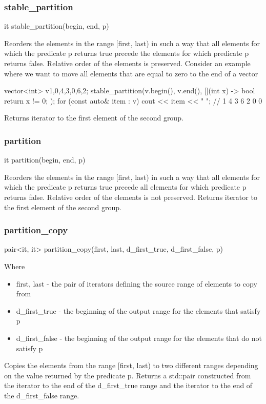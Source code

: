 \documentclass{report}
\begin{document}
\subsubsection{stable\_partition}
\bigbreak \noindent 
\begin{cppcode}
it stable_partition(begin, end, p)
\end{cppcode}
\bigbreak \noindent 
 Reorders the elements in the range [first, last) in such a way that all elements for which the predicate p returns true precede the elements for which predicate p returns false. Relative order of the elements is preserved.
 \bigbreak \noindent 
 Consider an example where we want to move all elements that are equal to zero to the end of a vector
 \bigbreak \noindent 
 \begin{cppcode}
     vector<int> v{1,0,4,3,0,6,2};
     stable_partition(v.begin(), v.end(), [](int x) -> bool {
        return x != 0;
     });
     for (const auto& item : v) cout << item << " ";
     // 1 4 3 6 2 0 0
 \end{cppcode}
 \bigbreak \noindent 
 Returns iterator to the first element of the second group.

 \bigbreak \noindent 
 \subsubsection{partition}
 \bigbreak \noindent 
 \begin{cppcode}
    it partition(begin, end, p) 
 \end{cppcode}
 \bigbreak \noindent 
 Reorders the elements in the range [first, last) in such a way that all elements for which the predicate p returns true precede all elements for which predicate p returns false. Relative order of the elements is not preserved.
 \bigbreak \noindent 
 Returns iterator to the first element of the second group.

 \bigbreak \noindent 
 \subsubsection{partition\_copy}
 \bigbreak \noindent 
 \begin{cppcode}
 pair<it, it> partition_copy(first, last, d_first_true, d_first_false, p)
 \end{cppcode}
 Where
 \begin{itemize}
     \item first, last	-	the pair of iterators defining the source range of elements to copy from
     \item d\_first\_true	-	the beginning of the output range for the elements that satisfy p
     \item d\_first\_false	-	the beginning of the output range for the elements that do not satisfy p
 \end{itemize}
 \bigbreak \noindent 
 Copies the elements from the range [first, last) to two different ranges depending on the value returned by the predicate p.
 \bigbreak \noindent 
 Returns a std::pair constructed from the iterator to the end of the d\_first\_true range and the iterator to the end of the d\_first\_false range.
\end{document}
